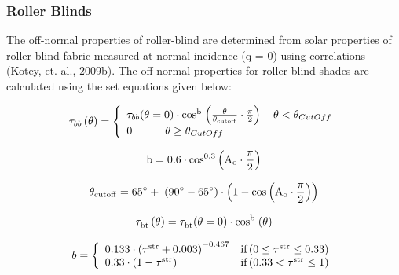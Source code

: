 \subsubsection{Roller Blinds}\label{roller-blinds}

The off-normal properties of roller-blind are determined from solar properties of roller blind fabric measured at normal incidence (q = 0) using correlations (Kotey, et. al., 2009b). The off-normal properties for roller blind shades are calculated using the set equations given below:

\begin{equation}
{{\rm{\tau }}_{bb}}\left( {\rm{\theta }} \right) = \left\{ \begin{array}{l}{{\rm{\tau }}_{bb}}{\rm{(\theta }} = {\rm{0)}} \cdot {\rm{co}}{{\rm{s}}^{\rm{b}}}{\kern 1pt} \left( {\frac{{\rm{\theta }}}{{{{\rm{\theta }}_{{\rm{cutoff}}}}}} \cdot \frac{\pi }{2}} \right)\quad \theta  < {\theta_{CutOff}}\\0\quad \quad \quad \theta  \ge {\theta_{CutOff}}\end{array} \right.
\end{equation}

\begin{equation}
{\rm{b}} = {\rm{0}}{\rm{.6}} \cdot {\rm{co}}{{\rm{s}}^{{\rm{0}}{\rm{.3}}}}\left( {{{\rm{A}}_{\rm{o}}} \cdot \frac{{\rm{\pi }}}{{\rm{2}}}} \right)
\end{equation}

\begin{equation}
{{\rm{\theta }}_{{\rm{cutoff}}}} = {\rm{65}}^\circ  + \;\left( {{\rm{90}}^\circ  - {\rm{65}}^\circ } \right) \cdot \left( {{\rm{1}} - {\rm{cos}}\left( {{{\rm{A}}_{\rm{o}}} \cdot \frac{{\rm{\pi }}}{{\rm{2}}}} \right)} \right)
\end{equation}

\begin{equation}
{\rm{\tau }}_{{\rm{bt}}}^{}\left( {\rm{\theta }} \right) = {\rm{\tau }}_{{\rm{bt}}}^{}{\rm{(\theta }} = {\rm{0)}} \cdot {\rm{co}}{{\rm{s}}^{\rm{b}}}{\kern 1pt} \left( {\rm{\theta }} \right)
\end{equation}

\begin{equation}
b = \left\{ 
    \begin{array}{lc}
      0.133 \cdot \left( \rm{\tau}^{str} + 0.003 \right)^{-0.467} &\text{if} \left( 0 \le \rm{\tau}^{str} \le 0.33 \right) \\
      0.33 \cdot \left( 1 - \rm{\tau}^{str} \right)               &\text{if} \left( 0.33 < \rm{\tau}^{str} \le 1 \right)
    \end{array}
  \right.
\end{equation}

